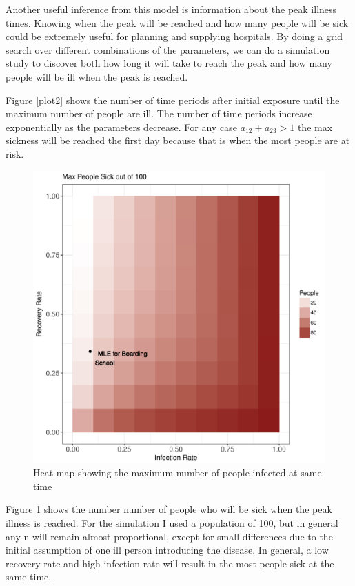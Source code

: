 \documentclass{svproc}
\begin{document}
Another useful inference from this model is information about the peak illness times. Knowing when the peak will be reached and how many people will be sick could be extremely useful for planning and supplying hospitals. By doing a grid search over different combinations of the parameters, we can do a simulation study to discover both how long it will take to reach the peak and how many people will be ill when the peak is reached. 


Figure \ref{plot2} shows the number of time periods after initial exposure until the maximum number of people are ill. The number of time periods increase exponentially as the parameters decrease. For any case $a_{12}+a_{23}>1$ the max sickness will be reached the first day because that is when the most people are at risk. 

\begin{figure}
\centering
\includegraphics[scale=.7]{MaxGrid.pdf}
\caption{Heat map showing the maximum number of people infected at same time}
\label{plot3}
\end{figure}

Figure \ref{plot3} shows the number number of people who will be sick when the peak illness is reached. For the simulation I used a population of 100, but in general any n will remain almost proportional, except for small differences due to the initial assumption of one ill person introducing the disease. In general, a low recovery rate and high infection rate will result in the most people sick at the same time.
\end{document}
